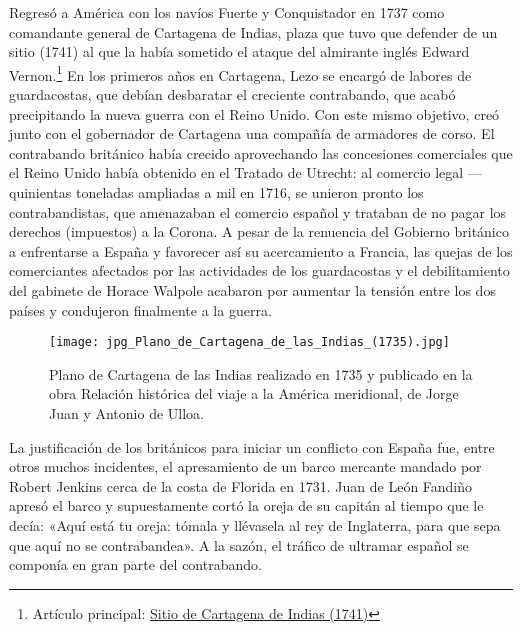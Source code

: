 
Regresó a América con los navíos Fuerte y Conquistador en 1737 como
comandante general de Cartagena de Indias, plaza que tuvo que defender
de un sitio (1741) al que la había sometido el ataque del almirante
inglés Edward Vernon.\footnote{Artículo principal:
  \href{https://is.gd/m45nMc}{Sitio de Cartagena de Indias (1741)}} En
los primeros años en Cartagena, Lezo se encargó de labores de
guardacostas, que debían desbaratar el creciente contrabando, que
acabó precipitando la nueva guerra con el  Reino
Unido. Con este mismo objetivo, creó junto con el gobernador de
Cartagena una compañía de armadores de corso. El contrabando británico
había crecido aprovechando las concesiones comerciales que el Reino
Unido había obtenido en el Tratado de Utrecht: al comercio legal ---quinientas toneladas ampliadas a mil
en 1716, se unieron pronto los contrabandistas, que amenazaban el
comercio español y trataban de no pagar los derechos (impuestos) a la
Corona. A pesar de la renuencia del Gobierno británico a enfrentarse a
España y favorecer así su acercamiento a Francia, las quejas de los
comerciantes afectados por las actividades de los guardacostas y el
debilitamiento del gabinete de Horace Walpole acabaron por aumentar la
tensión entre los dos países y condujeron finalmente a la guerra.

\begin{figure}[!hbp]
\centering
\texttt{[image: jpg\_Plano\_de\_Cartagena\_de\_las\_Indias\_(1735).jpg]}
\caption{\label{fig:planoCartagena} Plano de Cartagena de las Indias
  realizado en 1735 y publicado en la obra Relación histórica del
  viaje a la América meridional, de Jorge Juan y Antonio de Ulloa.}
\end{figure}

La justificación de los británicos para iniciar un conflicto con
España fue, entre otros muchos incidentes, el apresamiento de un barco
mercante mandado por Robert Jenkins  cerca de la costa
de Florida  en 1731. Juan de León Fandiño apresó el
barco y supuestamente cortó la oreja de su capitán al tiempo que le
decía: «Aquí está tu oreja: tómala y llévasela al rey de Inglaterra,
para que sepa que aquí no se contrabandea». A la sazón, el tráfico de
ultramar español se componía en gran parte del contrabando.

